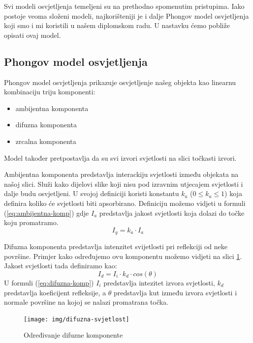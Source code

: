 \documentclass[times, utf8, diplomskirad]{fer}
\begin{document}
Svi modeli osvjetljenja temeljeni su na prethodno spomenutim pristupima.
Iako postoje veoma složeni modeli, najkorišteniji je i dalje Phongov model osvjetljenja koji smo i mi koristili u našem diplomskom radu.
U nastavku ćemo pobliže opisati ovaj model.

\subsection{Phongov model osvjetljenja}
Phongov model osvjetljenja prikazuje osvjetljenje našeg objekta kao linearnu kombinaciju triju komponenti:
\begin{itemize}
    \item ambijentna komponenta
    \item difuzna komponenta
    \item zrcalna komponenta
\end{itemize}
Model također pretpostavlja da su svi izvori svjetlosti na slici točkasti izvori.

Ambijentna komponenta predstavlja interackiju svjetlosti između objekata na našoj slici.
Služi kako dijelovi slike koji nisu pod izravnim utjecajem svjetlosti i dalje budu osvjetljeni.
U svojoj definiciji koristi konstantu $k_a$ ($0 \leq k_a \leq 1$) koja definira koliko će svjetlosti biti apsorbirano.
Definiciju možemo vidjeti u formuli (\ref{eq:ambijentna-komp}) gdje $I_a$ predstavlja jakost svjetlosti koja dolazi do točke koju promatramo.
\begin{equation}
    I_g = k_a \cdot I_a
    \label{eq:ambijentna-komp}
\end{equation}

Difuzna komponenta predstavlja intenzitet svijetlosti pri reflekciji od neke površine.
Primjer kako određujemo ovu komponentu možemo vidjeti na slici \ref{fig:difuzna-svjetlost}.
Jakost svjetlosti tada definiramo kao:
\begin{equation}
    I_d = I_i \cdot k_d \cdot cos(\theta)
    \label{eq:difuzna-komp}
\end{equation}
U formuli (\ref{eq:difuzna-komp}) $I_i$ predstavlja intezitet izvora svjetlosti, $k_d$ predstavlja koeficijent refleksije, a $\theta$ predstavlja kut između izvora svjetlosti i normale površine na kojoj se nalazi promatrana točka.

\begin{figure}[H]
    \centering
    \texttt{[image: img/difuzna-svjetlost]}
    \caption{Određivanje difuzne komponente}
    \label{fig:difuzna-svjetlost}
\end{figure}
\end{document}

